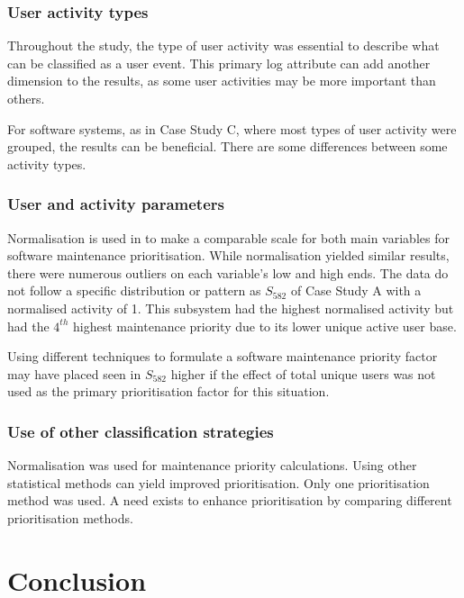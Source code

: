 \subsubsection{User activity types}
Throughout the study, the type of user activity was essential to describe what can be classified as a user event. This primary log attribute can add another dimension to the results, as some user activities may be more important than others. \par For software systems, as in Case Study C, where most types of user activity were grouped, the results can be beneficial. There are some differences between some activity types. 

\subsubsection{User and activity parameters}
\par Normalisation is used in  to make a comparable scale for both main variables for software maintenance prioritisation. While normalisation yielded similar results, there were numerous outliers on each variable's low and high ends. The data do not follow a specific distribution or pattern as $S_{582}$ of Case Study A with a normalised activity of 1. This subsystem had the highest normalised activity but had the $4^{th}$ highest maintenance priority due to its lower unique active user base. \par Using different techniques to formulate a software maintenance priority factor may have placed seen in $S_{582}$ higher if the effect of total unique users was not used as the primary prioritisation factor for this situation. 

\subsubsection{Use of other classification strategies}
Normalisation was used for maintenance priority calculations. Using other statistical methods can yield improved prioritisation. Only one prioritisation method was used. A need exists to enhance prioritisation by comparing different prioritisation methods.

\section{Conclusion}

